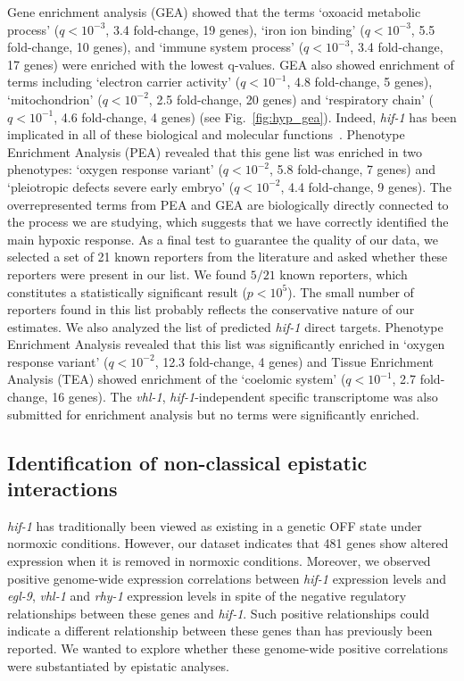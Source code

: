 \documentclass[9pt,twocolumn,twoside]{pnas-new}
\newcommand{\qval}[1]{$q<10^{-#1}$}
\newcommand{\egl}{\emph{egl-9}}
\newcommand{\rhy}{\emph{rhy-1}}
\newcommand{\vhl}{\emph{vhl-1}}
\newcommand{\hif}{\emph{hif-1}}
\newcommand{\hifn}{481}
\begin{document}
Gene enrichment analysis (GEA) showed that the terms `oxoacid metabolic process'
(\qval{3}, 3.4 fold-change, 19 genes),
`iron ion binding' (\qval{3}, 5.5 fold-change, 10 genes),
and `immune system process' (\qval{3}, 3.4 fold-change, 17 genes) were enriched
with the lowest q-values. GEA also showed enrichment of terms including
`electron carrier activity' (\qval{1}, 4.8 fold-change, 5 genes),
`mitochondrion' (\qval{2}, 2.5 fold-change, 20 genes)
and `respiratory chain' (\qval{1}, 4.6 fold-change, 4 genes) (see
Fig.~\ref{fig:hyp_gea}). Indeed, \hif{} has been implicated in
all of these biological and molecular functions~\cite{Luhachack2012,Ackerman2012,
Romney2011,Semenza2011}. Phenotype Enrichment Analysis (PEA) revealed that this
gene list was enriched in two phenotypes: `oxygen response variant' (\qval{2},
5.8 fold-change, 7 genes) and `pleiotropic defects severe early embryo' (\qval{2},
4.4 fold-change, 9 genes). The overrepresented terms from PEA and GEA are biologically
directly connected to the process we are studying, which suggests that we have
correctly identified the main hypoxic response. As a final test to guarantee the
quality of our data, we selected a set of 21 known reporters from the literature
and asked whether these reporters were present in our list. We found $5/21$ known
reporters, which constitutes a statistically significant result ($p<10^{5}$).
The small number of reporters found in this list probably reflects the conservative
nature of our estimates. We also analyzed the list of predicted \hif{} direct targets.
Phenotype Enrichment Analysis revealed that this list was significantly enriched in
`oxygen response variant' (\qval{2}, 12.3 fold-change, 4 genes) and Tissue Enrichment
Analysis (TEA) showed enrichment of the `coelomic system' (\qval{1}, 2.7 fold-change,
16 genes). The \vhl{}, \hif{}-independent specific transcriptome was also submitted
for enrichment analysis but no terms were significantly enriched.

\subsection{Identification of non-classical epistatic interactions}
\label{sub:hifoh}
\hif{} has traditionally been viewed as existing in a genetic OFF state under
normoxic conditions. However, our dataset indicates that \hifn{} genes show
altered expression when it is removed in normoxic conditions. Moreover, we
observed positive genome-wide expression correlations between \hif{} expression
levels and \egl{}, \vhl{} and \rhy{} expression levels in spite of the negative
regulatory relationships between these genes and \hif{}. Such positive
relationships could indicate a different relationship between these genes
than has previously been reported. We wanted to explore whether these genome-wide
positive correlations were substantiated by epistatic analyses.
\end{document}
